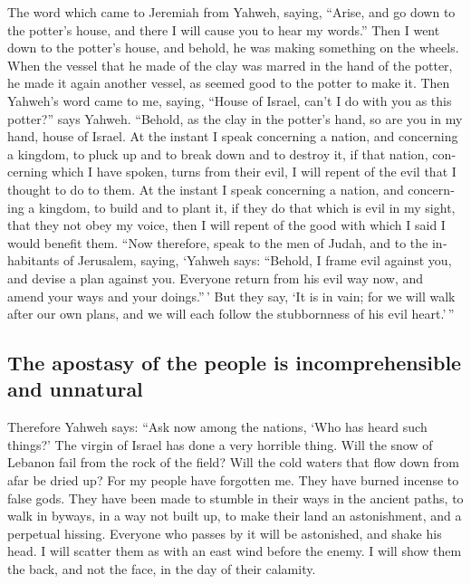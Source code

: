 \begin{paracol}{2}
\begin{otherlanguage}{english}
 The word which came to Jeremiah from Yahweh, saying,
 ``Arise, and go down to the potter's house, and there I
will cause you to hear my words.''  Then I went down to
the potter's house, and behold, he was making something on the wheels.
 When the vessel that he made of the clay was marred in
the hand of the potter, he made it again another vessel, as seemed good
to the potter to make it.  Then Yahweh's word came to me,
saying,  ``House of Israel, can't I do with you as this
potter?'' says Yahweh. ``Behold, as the clay in the potter's hand, so
are you in my hand, house of Israel.  At the instant I
speak concerning a nation, and concerning a kingdom, to pluck up and to
break down and to destroy it,  if that nation, concerning
which I have spoken, turns from their evil, I will repent of the evil
that I thought to do to them.  At the instant I speak
concerning a nation, and concerning a kingdom, to build and to plant it,
 if they do that which is evil in my sight, that they not
obey my voice, then I will repent of the good with which I said I would
benefit them.  ``Now therefore, speak to the men of
Judah, and to the inhabitants of Jerusalem, saying, `Yahweh says:
``Behold, I frame evil against you, and devise a plan against you.
Everyone return from his evil way now, and amend your ways and your
doings.''\,'  But they say, `It is in vain; for we will
walk after our own plans, and we will each follow the stubbornness of
his evil heart.'\,''

\hypertarget{the-apostasy-of-the-people-is-incomprehensible-and-unnatural}{%
\subsection{The apostasy of the people is incomprehensible and
unnatural}\label{the-apostasy-of-the-people-is-incomprehensible-and-unnatural}}

 Therefore Yahweh says: ``Ask now among the nations, `Who
has heard such things?' The virgin of Israel has done a very horrible
thing.  Will the snow of Lebanon fail from the rock of
the field? Will the cold waters that flow down from afar be dried up?
 For my people have forgotten me. They have burned
incense to false gods. They have been made to stumble in their ways in
the ancient paths, to walk in byways, in a way not built up,
 to make their land an astonishment, and a perpetual
hissing. Everyone who passes by it will be astonished, and shake his
head.  I will scatter them as with an east wind before
the enemy. I will show them the back, and not the face, in the day of
their calamity.


\end{otherlanguage}
\end{paracol}
